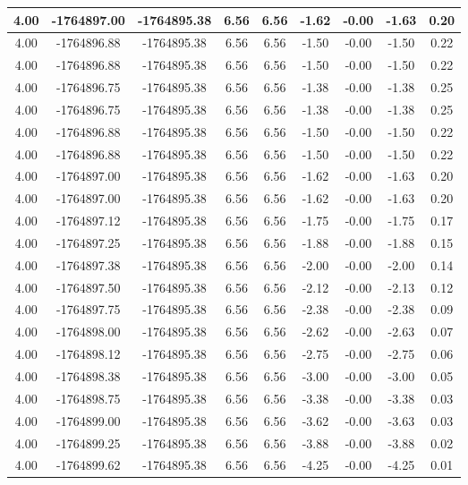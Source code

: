 \begin{table}[htbp]
\begin{adjustbox}{angle=90}
\begin{tabular}{|c|c|c|c|c|c|c|c|c|}
 4.00 & -1764897.00 & -1764895.38 & 6.56 & 6.56 & -1.62 & -0.00 & -1.63 & 0.20\\ \hline
 4.00 & -1764896.88 & -1764895.38 & 6.56 & 6.56 & -1.50 & -0.00 & -1.50 & 0.22\\ \hline
 4.00 & -1764896.88 & -1764895.38 & 6.56 & 6.56 & -1.50 & -0.00 & -1.50 & 0.22\\ \hline
 4.00 & -1764896.75 & -1764895.38 & 6.56 & 6.56 & -1.38 & -0.00 & -1.38 & 0.25\\ \hline
 4.00 & -1764896.75 & -1764895.38 & 6.56 & 6.56 & -1.38 & -0.00 & -1.38 & 0.25\\ \hline
 4.00 & -1764896.88 & -1764895.38 & 6.56 & 6.56 & -1.50 & -0.00 & -1.50 & 0.22\\ \hline
 4.00 & -1764896.88 & -1764895.38 & 6.56 & 6.56 & -1.50 & -0.00 & -1.50 & 0.22\\ \hline
 4.00 & -1764897.00 & -1764895.38 & 6.56 & 6.56 & -1.62 & -0.00 & -1.63 & 0.20\\ \hline
 4.00 & -1764897.00 & -1764895.38 & 6.56 & 6.56 & -1.62 & -0.00 & -1.63 & 0.20\\ \hline
 4.00 & -1764897.12 & -1764895.38 & 6.56 & 6.56 & -1.75 & -0.00 & -1.75 & 0.17\\ \hline
 4.00 & -1764897.25 & -1764895.38 & 6.56 & 6.56 & -1.88 & -0.00 & -1.88 & 0.15\\ \hline
 4.00 & -1764897.38 & -1764895.38 & 6.56 & 6.56 & -2.00 & -0.00 & -2.00 & 0.14\\ \hline
 4.00 & -1764897.50 & -1764895.38 & 6.56 & 6.56 & -2.12 & -0.00 & -2.13 & 0.12\\ \hline
 4.00 & -1764897.75 & -1764895.38 & 6.56 & 6.56 & -2.38 & -0.00 & -2.38 & 0.09\\ \hline
 4.00 & -1764898.00 & -1764895.38 & 6.56 & 6.56 & -2.62 & -0.00 & -2.63 & 0.07\\ \hline
 4.00 & -1764898.12 & -1764895.38 & 6.56 & 6.56 & -2.75 & -0.00 & -2.75 & 0.06\\ \hline
 4.00 & -1764898.38 & -1764895.38 & 6.56 & 6.56 & -3.00 & -0.00 & -3.00 & 0.05\\ \hline
 4.00 & -1764898.75 & -1764895.38 & 6.56 & 6.56 & -3.38 & -0.00 & -3.38 & 0.03\\ \hline
 4.00 & -1764899.00 & -1764895.38 & 6.56 & 6.56 & -3.62 & -0.00 & -3.63 & 0.03\\ \hline
 4.00 & -1764899.25 & -1764895.38 & 6.56 & 6.56 & -3.88 & -0.00 & -3.88 & 0.02\\ \hline
 4.00 & -1764899.62 & -1764895.38 & 6.56 & 6.56 & -4.25 & -0.00 & -4.25 & 0.01\\ \hline

\end{tabular}
\end{adjustbox}
\end{table}
